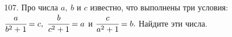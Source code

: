 107. Про числа $a,\ b$ и $c$ известно, что выполнены три условия: $\cfrac{a}{b^2+1}=c,\ \cfrac{b}{c^2+1}=a$ и $\cfrac{c}{a^2+1}=b.$ Найдите эти числа.\\
